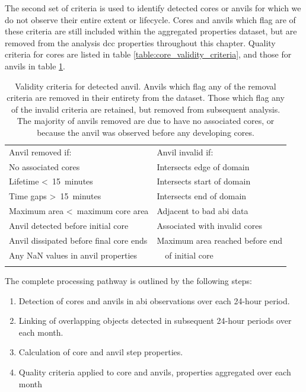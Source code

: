 The second set of criteria is used to identify detected cores or anvils for which we do not observe their entire extent or lifecycle.
Cores and anvils which flag are of these criteria are still included within the aggregated properties dataset, but are removed from the analysis \acrshort{dcc} properties throughout this chapter.
Quality criteria for cores are listed in table \ref{table:core_validity_criteria}, and those for anvils in table \ref{table:anvil_validity_criteria}.


\begin{table}[tb]
\centering
\begin{tabular}{ll}
\tophline
Anvil removed if:                               & Anvil invalid if: \\
\middlehline
No associated cores                             & Intersects edge of domain \\
Lifetime \textless~15~minutes                   & Intersects start of domain \\             
Time gaps \textgreater~15~minutes               & Intersects end of domain \\
Maximum area \textless~maximum core area        & Adjacent to bad \acrshort{abi} data \\
Anvil detected before initial core              & Associated with invalid cores \\
Anvil dissipated before final core ends         & Maximum area reached before end \\
Any NaN values in anvil properties              & ~~of initial core \\
\bottomhline
\end{tabular}
\caption[
Validity criteria for detected anvils
]{
Validity criteria for detected anvil. Anvils which flag any of the removal criteria are removed in their entirety from the dataset. Those which flag any of the invalid criteria are retained, but removed from subsequent analysis. The majority of anvils removed are due to have no associated cores, or because the anvil was observed before any developing cores.}
\label{table:anvil_validity_criteria}
\end{table}


The complete processing pathway is outlined by the following steps:

\begin{enumerate}
    \item Detection of cores and anvils in \acrshort{abi} observations over each 24-hour period.
    \item Linking of overlapping objects detected in subsequent 24-hour periods over each month.
    \item Calculation of core and anvil step properties. 
    \item Quality criteria applied to core and anvils, properties aggregated over each month
\end{enumerate}


